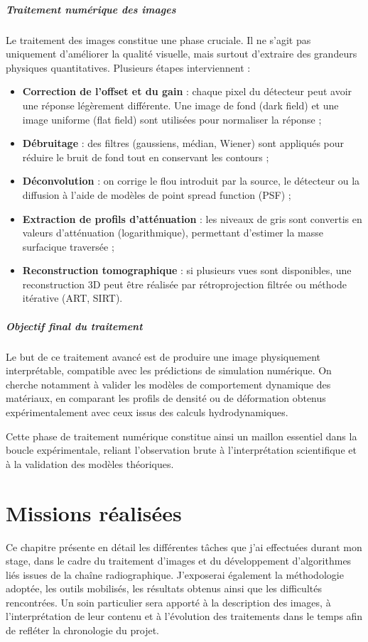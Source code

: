 \documentclass[12pt,a4paper]{report}
\begin{document}
\paragraph{Traitement numérique des images}
Le traitement des images constitue une phase cruciale. Il ne s’agit pas uniquement d’améliorer la qualité visuelle, mais surtout d’extraire des grandeurs physiques quantitatives. Plusieurs étapes interviennent :
\begin{itemize}
\item \textbf{Correction de l’offset et du gain} : chaque pixel du détecteur peut avoir une réponse légèrement différente. Une image de fond (dark field) et une image uniforme (flat field) sont utilisées pour normaliser la réponse ;
\item \textbf{Débruitage} : des filtres (gaussiens, médian, Wiener) sont appliqués pour réduire le bruit de fond tout en conservant les contours ;
\item \textbf{Déconvolution} : on corrige le flou introduit par la source, le détecteur ou la diffusion à l’aide de modèles de point spread function (PSF) ;
\item \textbf{Extraction de profils d’atténuation} : les niveaux de gris sont convertis en valeurs d’atténuation (logarithmique), permettant d’estimer la masse surfacique traversée ;
\item \textbf{Reconstruction tomographique} : si plusieurs vues sont disponibles, une reconstruction 3D peut être réalisée par rétroprojection filtrée ou méthode itérative (ART, SIRT).
\end{itemize}

\paragraph{Objectif final du traitement}
Le but de ce traitement avancé est de produire une image physiquement interprétable, compatible avec les prédictions de simulation numérique. On cherche notamment à valider les modèles de comportement dynamique des matériaux, en comparant les profils de densité ou de déformation obtenus expérimentalement avec ceux issus des calculs hydrodynamiques.

Cette phase de traitement numérique constitue ainsi un maillon essentiel dans la boucle expérimentale, reliant l’observation brute à l’interprétation scientifique et à la validation des modèles théoriques.

\chapter{Missions réalisées}
Ce chapitre présente en détail les différentes tâches que j’ai effectuées durant mon stage, dans le cadre du traitement d’images et du développement d'algorithmes liés issues de la chaîne radiographique. J’exposerai également la méthodologie adoptée, les outils mobilisés, les résultats obtenus ainsi que les difficultés rencontrées. Un soin particulier sera apporté à la description des images, à l'interprétation de leur contenu et à l’évolution des traitements dans le temps afin de refléter la chronologie du projet.
\end{document}
